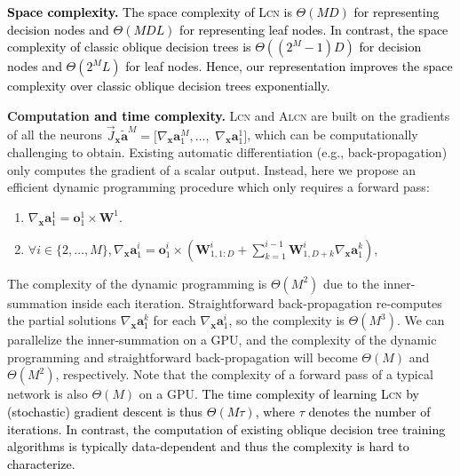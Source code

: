 \documentclass{article} \usepackage{iclr2020_conference,times}
\newcommand{\camera}[1]{\textcolor{black}{#1}}
\def\va{{\bm{a}}}
\def\vo{{\bm{o}}}
\def\vx{{\bm{x}}}
\def\mW{{\bm{W}}}
\begin{document}
\camera{\textbf{Space complexity.} The space complexity of \textsc{Lcn} is $\Theta(MD)$ for representing decision nodes and $\Theta(MDL)$ for representing leaf nodes. In contrast, the space complexity of classic oblique decision trees is $\Theta((2^M - 1) D)$ for decision nodes and $\Theta(2^M L)$ for leaf nodes. Hence, our representation improves the space complexity over classic oblique decision trees exponentially.}

\textbf{Computation \camera{and time complexity}.}
\textsc{Lcn} and \textsc{Alcn} are built on the gradients of all the neurons $\vec{J}_\vx \tilde \va^M = [\nabla_\vx \va^M_1,\dots,$ $\nabla_\vx \va^1_1]$, which can be computationally challenging to obtain. Existing automatic differentiation (e.g., back-propagation) only computes the gradient of a scalar output. Instead, here we propose an efficient dynamic programming procedure which only requires a forward pass:
\begin{enumerate}
\vspace{-2mm}
    \item $\nabla_\vx \va^1_1 = \vo^1_1 \times \mW^1$.
\vspace{-1mm}
    \item $\forall i \in \{2,\dots,M\}, \nabla_\vx \va^i_1 = \vo^i_1 \times (\mW^i_{1, 1:D} + \sum_{k=1}^{i-1} \mW^i_{1, D+k} \nabla_\vx \va^k_1)$,
\vspace{-2.5mm}
\end{enumerate}
The complexity of the dynamic programming is $\Theta(M^2)$ due to the inner-summation inside each iteration. Straightforward back-propagation re-computes the partial solutions $\nabla_\vx \va^k_1$ for each $\nabla_\vx \va^i_1$, so the complexity is $\Theta(M^3)$. We can parallelize the inner-summation on a GPU, and the complexity of the dynamic programming and straightforward back-propagation will become $\Theta(M)$ and $\Theta(M^2)$, respectively. Note that the complexity of a forward pass of a typical network is also $\Theta(M)$ on a GPU. \camera{The time complexity of learning \textsc{Lcn} by (stochastic) gradient descent is thus $\Theta(M \tau)$, where $\tau$ denotes the number of iterations. In contrast, the computation of existing oblique decision tree training algorithms is typically data-dependent and thus the complexity is hard to characterize.} 
\end{document}
